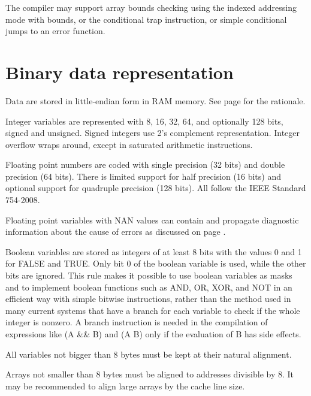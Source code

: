 \documentclass[forwardcom.tex]{subfiles}
\begin{document}
\vspace{2mm}
The compiler may support array bounds checking using the indexed addressing mode with bounds, or the conditional trap instruction, or simple conditional jumps to an error function. 

\section{Binary data representation} \label{binaryDataRepresentation}
Data are stored in little-endian form in RAM memory. See page \pageref{endianness} for the rationale. 
\vspace{2mm}

Integer variables are represented with 8, 16, 32, 64, and optionally 128 bits, signed and unsigned. Signed integers use 2's complement representation. Integer overflow wraps around, except in saturated arithmetic instructions. 
\vspace{2mm}

Floating point numbers are coded with single precision (32 bits) and double precision (64 bits). There is limited support for half precision (16 bits) and optional support for quadruple precision (128 bits). All follow the IEEE Standard 754-2008.
\vspace{2mm}

Floating point variables with NAN values can contain and propagate diagnostic information about the cause of errors as discussed on page \pageref{nanPropagation}. 
\vspace{2mm}

Boolean variables are stored as integers of at least 8 bits with the values 0 and 1 for FALSE and TRUE. Only bit 0 of the boolean variable is used, while the other bits are ignored. This rule makes it possible to use boolean variables as masks and to implement boolean functions such as AND, OR, XOR, and NOT in an efficient way with simple bitwise instructions, rather than the method used in many current systems that have a branch for each variable to check if the whole integer is nonzero. A branch instruction is needed in the compilation of expressions like (A \&\& B) and (A \textbar\textbar{} B) only if the evaluation of B has side effects. 
\vspace{2mm}

All variables not bigger than 8 bytes must be kept at their natural alignment.
\vspace{2mm}

Arrays not smaller than 8 bytes must be aligned to addresses divisible by 8. It may be recommended to align large arrays by the cache line size. 
\vspace{2mm}
\end{document}
